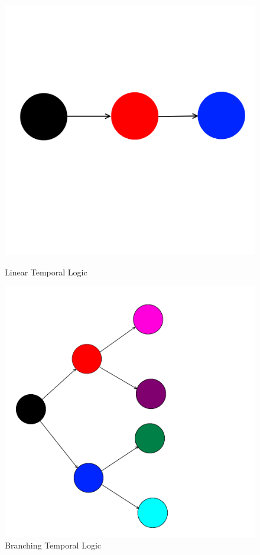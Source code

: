 \documentclass[12pt,a4paper]{report}
\begin{document}
\begin{figure}[!h]
  \centering
  \begin{minipage}[b]{0.4\textwidth}
    \includegraphics[width=\textwidth]{LinearTemporalLogic}
    \caption{Linear Temporal Logic}
  \end{minipage}
  \hfill
  \begin{minipage}[b]{0.4\textwidth}
    \includegraphics[width=\textwidth]{BranchingTemporalLogic}
    \caption{Branching Temporal Logic}
  \end{minipage}
\end{figure}
\FloatBarrier
\end{document}
